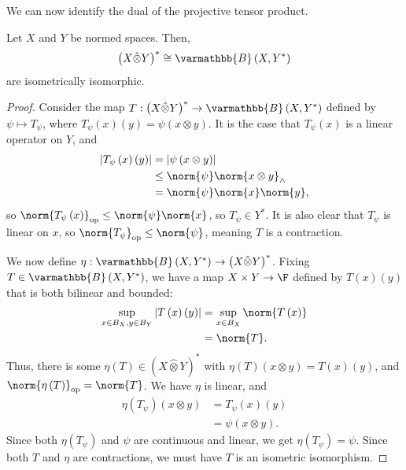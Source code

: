 \documentclass[10pt]{mypackage}
\renewcommand*{\mathbb}[1]{\varmathbb{#1}}
\newcommand{\B}{\mathbb{B}}
\begin{document}
We can now identify the dual of the projective tensor product.
\begin{proposition}
  Let $X$ and $Y$ be normed spaces. Then,
  \begin{align*}
    \left(X\hat\otimes Y\right)^{\ast}\cong \B\left(X,Y^{\ast}\right)
  \end{align*}
  are isometrically isomorphic.
\end{proposition}
\begin{proof}
  Consider the map $T: \left(X\hat\otimes Y\right)^{\ast}\rightarrow \B\left(X,Y^{\ast}\right)$ defined by $\psi \mapsto T_{\psi}$, where $T_{\psi}\left(x\right)\left(y\right) = \psi\left(x\otimes y\right)$. It is the case that $T_{\psi}\left(x\right)$ is a linear operator on $Y$, and
  \begin{align*}
    \left\vert T_{\psi}\left(x\right)\left(y\right) \right\vert &= \left\vert \psi\left(x\otimes y\right) \right\vert\\
                                                                &\leq \norm{\psi}\norm{x\otimes y}_{\wedge}\\
                                                                &= \norm{\psi}\norm{x}\norm{y},
  \end{align*}
  so $\norm{T_{\psi}\left(x\right)}_{\text{op}}\leq \norm{\psi}\norm{x}$, so $T_{\psi}\in Y^{\ast}$. It is also clear that $T_{\psi}$ is linear on $x$, so $\norm{T_{\psi}}_{\text{op}}\leq \norm{\psi}$, meaning $T$ is a contraction.\newline

  We now define $\eta: \B\left(X,Y^{\ast}\right)\rightarrow \left(X\hat\otimes Y\right)^{\ast}$. Fixing $T\in \B\left(X,Y^{\ast}\right)$, we have a map $X\times Y\rightarrow \F$ defined by $T\left(x\right)\left(y\right)$ that is both bilinear and bounded:
  \begin{align*}
    \sup_{x\in B_X,y\in B_Y}\left\vert T\left(x\right)\left(y\right) \right\vert &= \sup_{x\in B_X}\norm{T\left(x\right)}\\
                                                                                 &= \norm{T}.
  \end{align*}
  Thus, there is some $\eta\left(T\right)\in \left(X\hat\otimes Y\right)^{\ast}$ with $\eta\left(T\right)\left(x\otimes y\right) = T\left(x\right)\left(y\right)$, and $\norm{\eta\left(T\right)}_{\text{op}} = \norm{T}$. We have $\eta$ is linear, and
  \begin{align*}
    \eta\left(T_{\psi}\right)\left(x\otimes y\right) &= T_{\psi}\left(x\right)\left(y\right)\\
                                                     &= \psi\left(x\otimes y\right).
  \end{align*}
  Since both $\eta\left(T_{\psi}\right)$ and $\psi$ are continuous and linear, we get $\eta\left(T_{\psi}\right) = \psi$. Since both $T$ and $\eta$ are contractions, we must have $T$ is an isometric isomorphism.
\end{proof}
\end{document}
